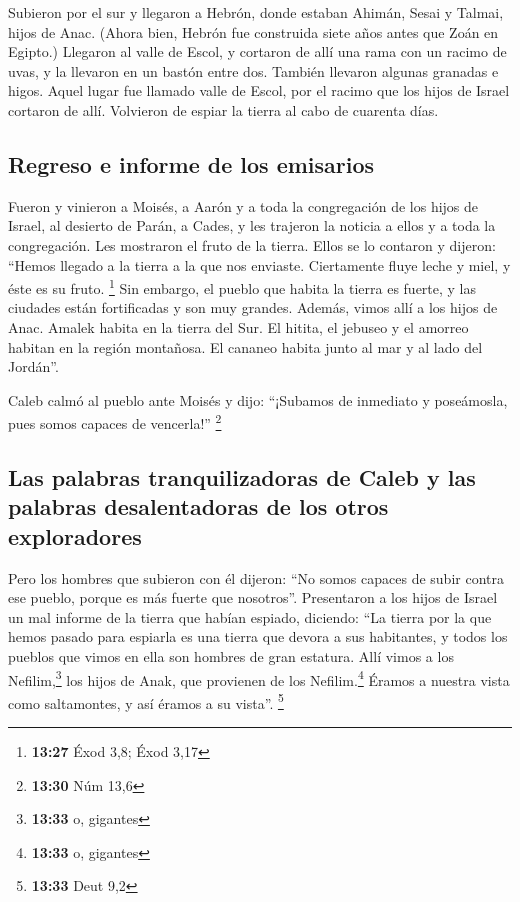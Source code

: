 \begin{paracol}{2}
 Subieron por el sur y llegaron a Hebrón, donde estaban
Ahimán, Sesai y Talmai, hijos de Anac. (Ahora bien, Hebrón fue
construida siete años antes que Zoán en Egipto.) 
Llegaron al valle de Escol, y cortaron de allí una rama con un racimo de
uvas, y la llevaron en un bastón entre dos. También llevaron algunas
granadas e higos.  Aquel lugar fue llamado valle de
Escol, por el racimo que los hijos de Israel cortaron de allí.
 Volvieron de espiar la tierra al cabo de cuarenta días.

\hypertarget{regreso-e-informe-de-los-emisarios}{%
\subsection{Regreso e informe de los
emisarios}\label{regreso-e-informe-de-los-emisarios}}

 Fueron y vinieron a Moisés, a Aarón y a toda la
congregación de los hijos de Israel, al desierto de Parán, a Cades, y
les trajeron la noticia a ellos y a toda la congregación. Les mostraron
el fruto de la tierra.  Ellos se lo contaron y dijeron:
``Hemos llegado a la tierra a la que nos enviaste. Ciertamente fluye
leche y miel, y éste es su fruto. \footnote{\textbf{13:27} Éxod 3,8;
  Éxod 3,17}  Sin embargo, el pueblo que habita la tierra
es fuerte, y las ciudades están fortificadas y son muy grandes. Además,
vimos allí a los hijos de Anac.  Amalek habita en la
tierra del Sur. El hitita, el jebuseo y el amorreo habitan en la región
montañosa. El cananeo habita junto al mar y al lado del Jordán''.

 Caleb calmó al pueblo ante Moisés y dijo: ``¡Subamos de
inmediato y poseámosla, pues somos capaces de vencerla!'' \footnote{\textbf{13:30}
  Núm 13,6}

\hypertarget{las-palabras-tranquilizadoras-de-caleb-y-las-palabras-desalentadoras-de-los-otros-exploradores}{%
\subsection{Las palabras tranquilizadoras de Caleb y las palabras
desalentadoras de los otros
exploradores}\label{las-palabras-tranquilizadoras-de-caleb-y-las-palabras-desalentadoras-de-los-otros-exploradores}}

 Pero los hombres que subieron con él dijeron: ``No somos
capaces de subir contra ese pueblo, porque es más fuerte que nosotros''.
 Presentaron a los hijos de Israel un mal informe de la
tierra que habían espiado, diciendo: ``La tierra por la que hemos pasado
para espiarla es una tierra que devora a sus habitantes, y todos los
pueblos que vimos en ella son hombres de gran estatura. 
Allí vimos a los Nefilim,\footnote{\textbf{13:33} o, gigantes} los hijos
de Anak, que provienen de los Nefilim.\footnote{\textbf{13:33} o,
  gigantes} Éramos a nuestra vista como saltamontes, y así éramos a su
vista''. \footnote{\textbf{13:33} Deut 9,2}


\end{paracol}
